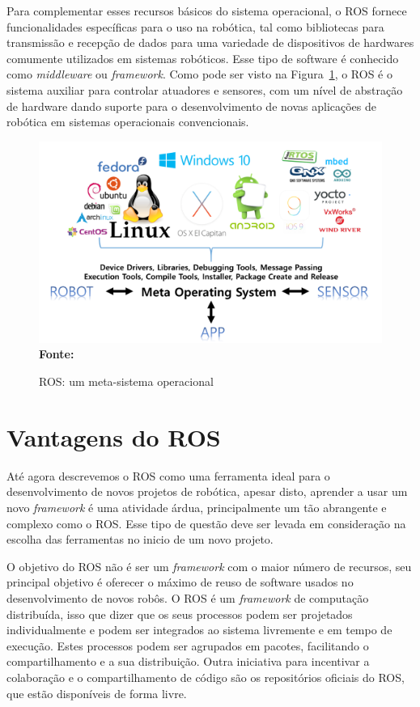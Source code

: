 Para complementar esses recursos básicos do sistema operacional, o ROS fornece funcionalidades específicas para o uso na robótica, tal como bibliotecas para transmissão e recepção de dados para uma variedade de dispositivos de hardwares comumente utilizados em sistemas robóticos. Esse tipo de software é conhecido como \textit{middleware} ou \textit{framework}. Como pode ser visto na Figura~\ref{fig:rosmeta}, o ROS é o sistema auxiliar para controlar atuadores e sensores, com um nível de abstração de hardware dando suporte para o desenvolvimento de novas aplicações de robótica em sistemas operacionais convencionais.

\begin{figure}[ht]
	\caption{ROS: um meta-sistema operacional}
	\begin{center}
		\includegraphics[scale=0.6]{imagens/metaOS.png}\\
		{\small \textbf{Fonte:} }
    \end{center}\label{fig:rosmeta}
\end{figure}


\section{Vantagens do ROS}
Até agora descrevemos o ROS como uma ferramenta ideal para o desenvolvimento de novos projetos de robótica, apesar disto, aprender a usar um novo \textit{framework} é uma atividade árdua, principalmente um tão abrangente e complexo como o ROS\@. Esse tipo de questão deve ser levada em consideração na escolha das ferramentas no inicio de um novo projeto. 

O objetivo do ROS não é ser um \textit{framework} com o maior número de recursos, seu principal objetivo é oferecer o máximo de reuso de software usados no desenvolvimento de novos robôs. O ROS é um \textit{framework} de computação distribuída, isso que dizer que os seus processos podem ser projetados individualmente e podem ser integrados ao sistema livremente e em tempo de execução. Estes processos podem ser agrupados em pacotes, facilitando o compartilhamento e a sua distribuição. Outra iniciativa para incentivar a colaboração e o compartilhamento de código são os repositórios oficiais do ROS, que estão disponíveis de forma livre. 

